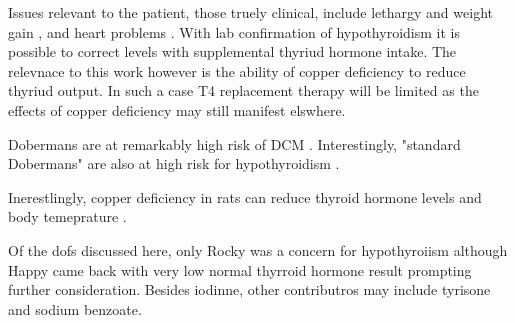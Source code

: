 {%
Issues relevant to the patient, those truely clinical, include
lethargy and  weight gain
\cite{Dixon_Reid_Mooney_Epidemiological_clinical_haematological_1999}
, and heart problems
\cite{PMC5512679}
. 
With lab confirmation of hypothyroidism it is possible to 
correct levels with supplemental thyriud hormone intake. 
The relevnace to this work however is the ability
of copper deficiency to reduce thyriud output. In such
a case T4 replacement therapy will be limited as the
effects of copper deficiency may still manifest elswhere.


Dobermans are at remarkably high risk of DCM 
\cite{Ezer_Saarinen_Katayama_Identification_novel_genetic_2023}.
Interestingly, "standard Dobermans" are also at high risk for hypothyroidism
\cite{PMC9552398}.

Inerestlingly, copper deficiency in rats can reduce thyroid
hormone levels and body temeprature \cite{Lukaski_Hall_Marchello_Body_temperature_thyroid_1995}.

Of the dofs discussed here, only Rocky was a concern for hypothyroiism although
Happy came back with very low normal thyrroid hormone result prompting
further consideration. Besides iodinne, other contributros may include
tyrisone and sodium benzoate. 

} %

